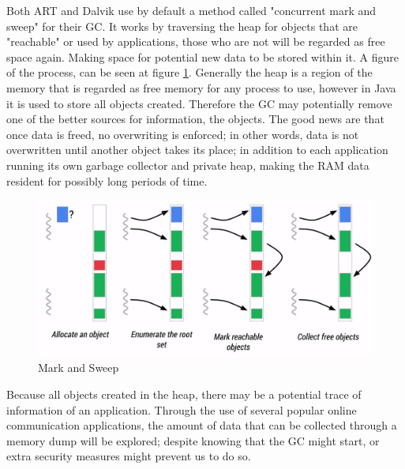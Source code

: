Both ART and Dalvik use by default a method called "concurrent mark and sweep" for their GC\cite{ARTGC,DALVIKGC}. It works by traversing the heap for objects that are "reachable" or used by applications, those who are not will be regarded as free space again. Making space for potential new data to be stored within it. A figure of the process, can be seen at figure \ref{fig:mas}. Generally the heap is a region of the memory that is regarded as free memory for any process to use, however in Java it is used to store all objects created. Therefore the GC may potentially remove one of the better sources for information, the objects. The good news are that once data is freed, no overwriting is enforced; in other words, data is not overwritten until another object takes its place\cite{DALVIKGC}; in addition to each application running its own garbage collector and private heap, making the RAM data resident for possibly long periods of time\cite{AndroidMemManagement}.

\begin{figure}[h]
  \includegraphics[width=0.5 \textwidth]{gc}
  \caption{Mark and Sweep\cite{ARTGC}}
  \label{fig:mas}
\end{figure}

Because all objects created in the heap, there may be a potential trace of information of an application. Through the use of several popular online communication applications, the amount of data that can be collected through a memory dump will be explored; despite knowing that the GC might start, or extra security measures might prevent us to do so.